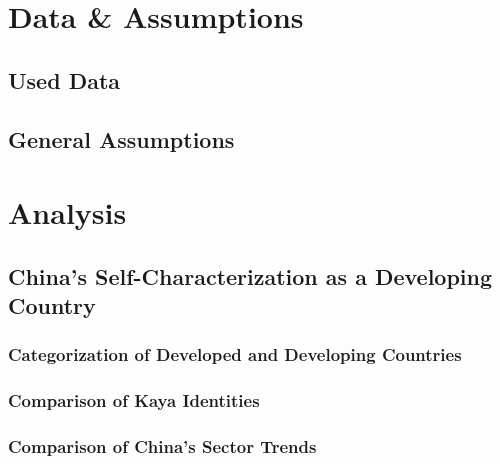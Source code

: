 \documentclass[
  12pt,
]{article}
\numberwithin{equation}{section}
\numberwithin{table}{section}
\numberwithin{figure}{section}
\begin{document}
\nocite{R-rmarkdown,R-tidyverse,R-eurostat,R-WDI,R-plotly,R-imputeTS,R-kableExtra}
\citet{WorldBank2022a} \citet{WorldBank2022b} \citet{Worldbank2022c}
\citet{Giacomo2022}

\hypertarget{data-assumptions}{%
\section{Data \& Assumptions}\label{data-assumptions}}

\hypertarget{used-data}{%
\subsection{Used Data}\label{used-data}}

\hypertarget{general-assumptions}{%
\subsection{General Assumptions}\label{general-assumptions}}

\hypertarget{analysis}{%
\section{Analysis}\label{analysis}}

\hypertarget{chinas-self-characterization-as-a-developing-country}{%
\subsection{China's Self-Characterization as a Developing
Country}\label{chinas-self-characterization-as-a-developing-country}}

\hypertarget{categorization-of-developed-and-developing-countries}{%
\subsubsection{Categorization of Developed and Developing
Countries}\label{categorization-of-developed-and-developing-countries}}

\hypertarget{comparison-of-kaya-identities}{%
\subsubsection{Comparison of Kaya
Identities}\label{comparison-of-kaya-identities}}

\hypertarget{comparison-of-chinas-sector-trends}{%
\subsubsection{Comparison of China's Sector
Trends}\label{comparison-of-chinas-sector-trends}}
\end{document}
